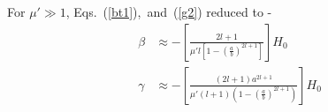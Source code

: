 


For $\mu'\gg 1$, Eqs.~(\ref{bt1}),~and~(\ref{g2}) reduced to -
\begin{align}
\beta &\approx-\left[\frac{2l+1}{\mu'l\left[1-\left(\frac{a}{b}\right)^{2l+1}\right]}\right]H_0\label{bt2}\\
\gamma &\approx-\left[\frac{(2l+1)a^{2l+1}}{\mu'(l+1)\left(1-\left(\frac{a}{b}\right)^{2l+1}\right)}\right] H_0\label{g3}
\end{align}


